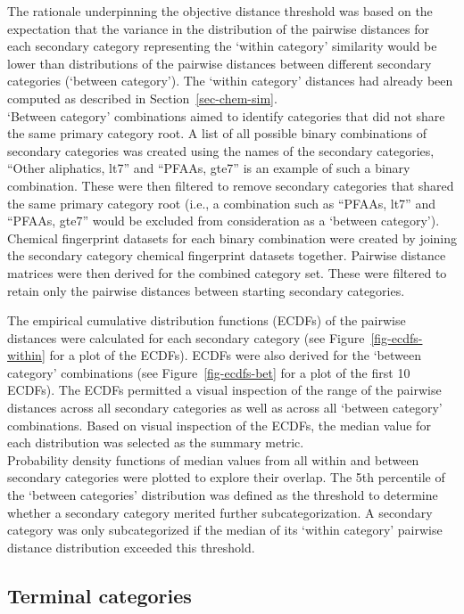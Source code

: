 \documentclass[
  super,
  preprint,
  3p]{elsarticle}
\begin{document}
The rationale underpinning the objective distance threshold was based on
the expectation that the variance in the distribution of the pairwise
distances for each secondary category representing the `within category'
similarity would be lower than distributions of the pairwise distances
between different secondary categories (`between category'). The `within
category' distances had already been computed as described in
Section~\ref{sec-chem-sim}.\\
`Between category' combinations aimed to identify categories that did
not share the same primary category root. A list of all possible binary
combinations of secondary categories was created using the names of the
secondary categories, ``Other aliphatics, lt7'' and ``PFAAs, gte7'' is
an example of such a binary combination. These were then filtered to
remove secondary categories that shared the same primary category root
(i.e., a combination such as ``PFAAs, lt7'' and ``PFAAs, gte7'' would be
excluded from consideration as a `between category'). Chemical
fingerprint datasets for each binary combination were created by joining
the secondary category chemical fingerprint datasets together. Pairwise
distance matrices were then derived for the combined category set. These
were filtered to retain only the pairwise distances between starting
secondary categories.

The empirical cumulative distribution functions (ECDFs) of the pairwise
distances were calculated for each secondary category (see
Figure~\ref{fig-ecdfs-within} for a plot of the ECDFs). ECDFs were also
derived for the `between category' combinations (see
Figure~\ref{fig-ecdfs-bet} for a plot of the first 10 ECDFs). The ECDFs
permitted a visual inspection of the range of the pairwise distances
across all secondary categories as well as across all `between category'
combinations. Based on visual inspection of the ECDFs, the median value
for each distribution was selected as the summary metric.\\
Probability density functions of median values from all within and
between secondary categories were plotted to explore their overlap. The
5th percentile of the `between categories' distribution was defined as
the threshold to determine whether a secondary category merited further
subcategorization. A secondary category was only subcategorized if the
median of its `within category' pairwise distance distribution exceeded
this threshold.

\hypertarget{sec-terminal}{%
\subsection{Terminal categories}\label{sec-terminal}}
\end{document}
